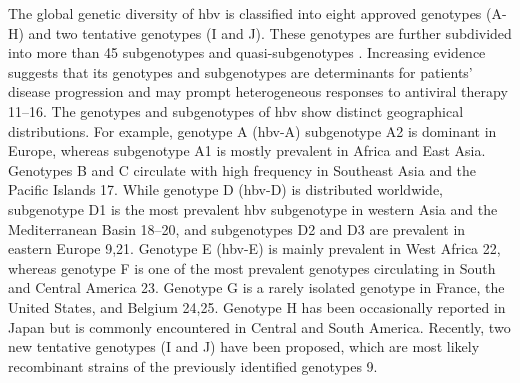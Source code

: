 The global genetic diversity of \gls{hbv} is classified into eight approved genotypes (A-H) and two tentative genotypes (I and J). These genotypes are further subdivided into more than 45 subgenotypes and quasi-subgenotypes \cite{pourkarim2014molecular,thijssen2020novel}. Increasing evidence suggests that its genotypes and subgenotypes are determinants for patients' disease progression and may prompt heterogeneous responses to antiviral therapy 11--16. The genotypes and subgenotypes of \gls{hbv} show distinct geographical distributions. For example, genotype A (\gls{hbv}-A) subgenotype A2 is dominant in Europe, whereas subgenotype A1 is mostly prevalent in Africa and East Asia. Genotypes B and C circulate with high frequency in Southeast Asia and the Pacific Islands 17. While genotype D (\gls{hbv}-D) is distributed worldwide, subgenotype D1 is the most prevalent \gls{hbv} subgenotype in western Asia and the Mediterranean Basin 18--20, and subgenotypes D2 and D3 are prevalent in eastern Europe 9,21. Genotype E (\gls{hbv}-E) is mainly prevalent in West Africa 22, whereas genotype F is one of the most prevalent genotypes circulating in South and Central America 23. Genotype G is a rarely isolated genotype in France, the United States, and Belgium 24,25. Genotype H has been occasionally reported in Japan but is commonly encountered in Central and South America. Recently, two new tentative genotypes (I and J) have been proposed, which are most likely recombinant strains of the previously identified genotypes 9.\\

